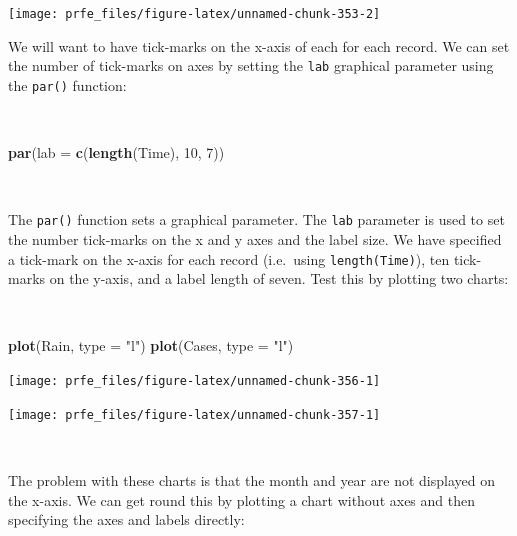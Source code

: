 \documentclass[12pt,a4paper]{book}
\newenvironment{Shaded}{\begin{snugshade}}{\end{snugshade}}
\newcommand{\KeywordTok}[1]{\textcolor[rgb]{0.13,0.29,0.53}{\textbf{#1}}}
\newcommand{\DataTypeTok}[1]{\textcolor[rgb]{0.13,0.29,0.53}{#1}}
\newcommand{\DecValTok}[1]{\textcolor[rgb]{0.00,0.00,0.81}{#1}}
\newcommand{\StringTok}[1]{\textcolor[rgb]{0.31,0.60,0.02}{#1}}
\newcommand{\NormalTok}[1]{#1}
\theoremstyle{definition}
\theoremstyle{definition}
\theoremstyle{definition}
\theoremstyle{remark}
\begin{document}
\begin{center}\texttt{[image: prfe\_files/figure-latex/unnamed-chunk-353-2]} \end{center}

\newpage

We will want to have tick-marks on the x-axis of each for each record.
We can set the number of tick-marks on axes by setting the \texttt{lab}
graphical parameter using the \texttt{par()} function:

~

\begin{Shaded}
\begin{Highlighting}[]
\KeywordTok{par}\NormalTok{(}\DataTypeTok{lab =} \KeywordTok{c}\NormalTok{(}\KeywordTok{length}\NormalTok{(Time), }\DecValTok{10}\NormalTok{, }\DecValTok{7}\NormalTok{))}
\end{Highlighting}
\end{Shaded}

~

The \texttt{par()} function sets a graphical parameter. The \texttt{lab}
parameter is used to set the number tick-marks on the x and y axes and
the label size. We have specified a tick-mark on the x-axis for each
record (i.e.~using \texttt{length(Time)}), ten tick-marks on the y-axis,
and a label length of seven. Test this by plotting two charts:

~

\begin{Shaded}
\begin{Highlighting}[]
\KeywordTok{plot}\NormalTok{(Rain, }\DataTypeTok{type =} \StringTok{"l"}\NormalTok{)}
\KeywordTok{plot}\NormalTok{(Cases, }\DataTypeTok{type =} \StringTok{"l"}\NormalTok{)}
\end{Highlighting}
\end{Shaded}

\begin{center}\texttt{[image: prfe\_files/figure-latex/unnamed-chunk-356-1]} \end{center}

\newpage

\begin{center}\texttt{[image: prfe\_files/figure-latex/unnamed-chunk-357-1]} \end{center}

~

The problem with these charts is that the month and year are not
displayed on the x-axis. We can get round this by plotting a chart
without axes and then specifying the axes and labels directly:
\end{document}
